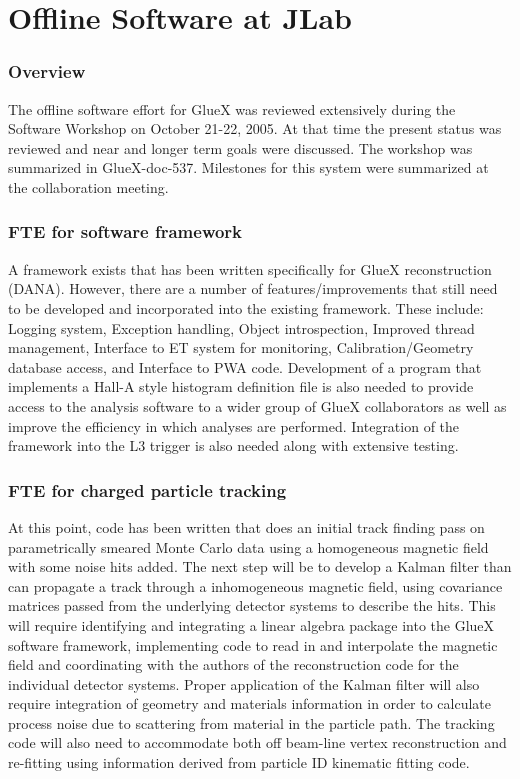 \documentclass[10pt]{article}
\begin{document}
\section*{Offline Software at JLab} 


\subsubsection*{Overview}

The offline software effort for GlueX was reviewed extensively during
the Software Workshop on October 21-22, 2005. 
At that time  the present
status was reviewed and near and longer term goals were discussed. 
The workshop was summarized in GlueX-doc-537.  
Milestones 
for this system were summarized at the collaboration meeting. 


\subsubsection*{FTE for software framework}

A framework exists that has been written specifically for GlueX
reconstruction (DANA). However, there are a number of
features/improvements that still need to be developed and incorporated
into the existing framework. These include: Logging system, Exception
handling, Object introspection, Improved thread management, Interface to
ET system for monitoring, Calibration/Geometry database access, and
Interface to PWA code. Development of a program that implements a Hall-A
style histogram definition file is also needed to provide access to the
analysis software to a wider group of GlueX collaborators as well as
improve the efficiency in which analyses are performed. Integration of
the framework into the L3 trigger is also needed along with extensive
testing.


\subsubsection*{FTE for charged particle tracking}

At this point, code has been written that does an initial track finding
pass on parametrically smeared Monte Carlo data using a homogeneous
magnetic field with some noise hits added. The next step will be to
develop a Kalman filter than can propagate a track through a
inhomogeneous magnetic field, using covariance matrices passed from the
underlying detector systems to describe the hits. This will require
identifying and integrating a linear algebra package into the GlueX
software framework, implementing code to read in and interpolate the
magnetic field and coordinating with the authors of the  reconstruction
code for the  individual detector systems.  Proper  application of the
Kalman filter will also require integration of geometry and materials
information in order to calculate process noise due to scattering from
material in the particle path. The tracking code will also need to
accommodate both off beam-line vertex reconstruction and re-fitting
using information
derived from particle ID kinematic fitting code.
\end{document}
